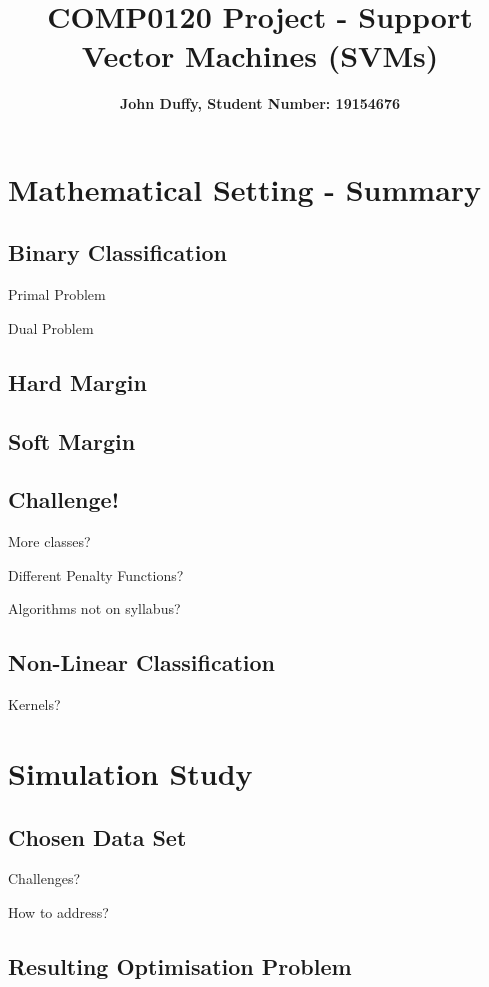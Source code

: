 \documentclass[10pt, a4paper]{amsart}
\title{COMP0120 Project - Support Vector Machines (SVMs)}
\author{\textbf{John Duffy, Student Number: 19154676}}
\begin{document}
\maketitle

\section{Mathematical Setting - Summary}

\subsection{Binary Classification}\hfill

Primal Problem

Dual Problem

\subsection{Hard Margin}

\subsection{Soft Margin}

\subsection{Challenge!}\hfill

More classes?

Different Penalty Functions?

Algorithms not on syllabus?

\subsection{Non-Linear Classification}\hfill

Kernels?


\section{Simulation Study}

\subsection{Chosen Data Set}\hfill

Challenges?

How to address?

\subsection{Resulting Optimisation Problem}\hfill
\end{document}
